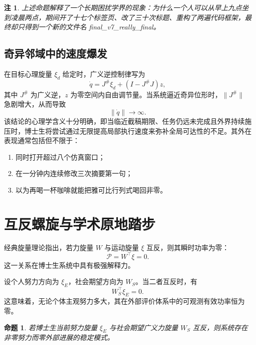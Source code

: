 \documentclass[UTF8,twocolumn,a4paper]{ctexart}
\newtheorem{proposition}{命题}
\newtheorem{remark}{注}
\begin{document}
\begin{remark}
上述命题解释了一个长期困扰学界的现象：为什么一个人可以从早上九点坐到凌晨两点，期间开了十七个标签页、改了三十次标题、重构了两遍代码框架，最终却只得到一个新的文件名 final\_v7\_really\_final。
\end{remark}

\subsection{奇异邻域中的速度爆发}

在目标心理旋量 $\xi_d$ 给定时，广义逆控制律写为
\begin{equation}
\dot{q}=J^\# \xi_d + \left(I-J^\#J\right)z,
\end{equation}
其中 $J^\#$ 为广义逆，$z$ 为零空间内自由调节量。当系统逼近奇异位形时，$\|J^\#\|$ 急剧增大，从而导致
\begin{equation}
\|\dot{q}\|\rightarrow \infty.
\end{equation}
该结论的心理学含义十分明确，即当临近截稿期限、任务仍远未完成且外界持续施压时，博士生将尝试通过无限提高局部执行速度来弥补全局可达性的不足。其外在表现通常包括但不限于：

\begin{enumerate}
  \item 同时打开超过八个仿真窗口；
  \item 在一分钟内连续修改三次摘要第一句；
  \item 以为再喝一杯咖啡就能把雅可比行列式喝回非零。
\end{enumerate}

\section{互反螺旋与学术原地踏步}

经典旋量理论指出，若力旋量 $W$ 与运动旋量 $\xi$ 互反，则其瞬时功率为零：
\begin{equation}
\mathcal{P}=W^\top \xi = 0.
\end{equation}
这一关系在博士生系统中具有极强解释力。

设个人努力方向为 $\xi_E$，社会期望方向为 $W_S$。当二者互反时，有
\begin{equation}
W_S^\top \xi_E = 0.
\end{equation}
这意味着，无论个体主观努力多大，其在外部评价体系中的可观测有效功率恒为零。

\begin{proposition}
若博士生当前努力旋量 $\xi_E$ 与社会期望广义力旋量 $W_S$ 互反，则系统存在非零努力而零外部进展的稳定模式。
\end{proposition}
\end{document}
